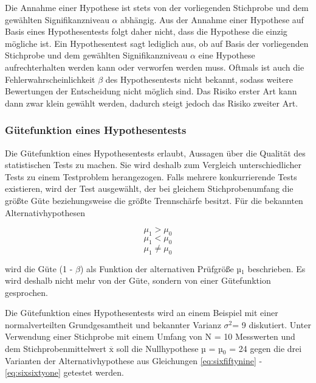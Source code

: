 \noindent Die Annahme einer Hypothese ist stets von der vorliegenden Stichprobe und dem gew\"{a}hlten Signifikanzniveau $\alpha$ abh\"{a}ngig. Aus der Annahme einer Hypothese auf Basis eines Hypothesentests folgt daher nicht, dass die Hypothese die einzig m\"{o}gliche ist. Ein Hypothesentest sagt lediglich aus, ob auf Basis der vorliegenden Stichprobe und dem gew\"{a}hlten Signifikanzniveau $\alpha$ eine Hypothese aufrechterhalten werden kann oder verworfen werden muss. Oftmals ist auch die Fehlerwahrscheinlichkeit $\beta$ des Hypothesentests nicht bekannt, sodass weitere Bewertungen der Entscheidung nicht m\"{o}glich sind. Das Risiko erster Art kann dann zwar klein gew\"{a}hlt werden, dadurch steigt jedoch das Risiko zweiter Art. 

\subsubsection{G\"{u}tefunktion eines Hypothesentests}

\noindent Die G\"{u}tefunktion eines Hypothesentests erlaubt, Aussagen \"{u}ber die Qualit\"{a}t des statistischen Tests zu machen. Sie wird deshalb zum Vergleich unterschiedlicher Tests zu einem Testproblem herangezogen. Falls mehrere konkurrierende Tests existieren, wird der Test ausgew\"{a}hlt, der bei gleichem Stichprobenumfang die gr\"{o}{\ss}te G\"{u}te beziehungsweise die gr\"{o}{\ss}te Trennsch\"{a}rfe besitzt. F\"{u}r die bekannten Alternativhypothesen

\begin{equation}\label{eq:sixfiftynine}
\mu _{1} >\mu _ 0
\end{equation}
\begin{equation}\label{eq:sixsixty}
\mu _{1} <\mu _ 0
\end{equation}
\begin{equation}\label{eq:sixsixtyone}
\mu _{1} \ne \mu _ 0
\end{equation}

\noindent wird die G\"{u}te (1 - $\beta$) als Funktion der alternativen Pr\"{u}fgr\"{o}{\ss}e µ$_{1}$ beschrieben. Es wird deshalb nicht mehr von der G\"{u}te, sondern von einer G\"{u}tefunktion gesprochen.\newline

\noindent Die G\"{u}tefunktion eines Hypothesentests wird an einem Beispiel mit einer normalverteilten Grundgesamtheit und bekannter Varianz $\sigma^{2}$= 9 diskutiert. Unter Verwendung einer Stichprobe mit einem Umfang von N = 10 Messwerten und dem Stichprobenmittelwert $\overline{\mathrm{x}}$ soll die Nullhypothese µ = µ$_{0}$ = 24 gegen die drei Varianten der Alternativhypothese aus Gleichungen \eqref{eq:sixfiftynine} - \eqref{eq:sixsixtyone} getestet werden.\newline

